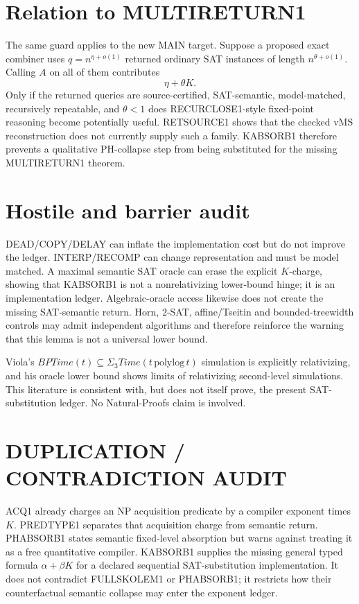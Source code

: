 \documentclass[11pt]{article}
\begin{document}
\section*{Relation to MULTIRETURN1}
The same guard applies to the new MAIN target. Suppose a proposed exact combiner uses \(q=n^{\eta+o(1)}\) returned ordinary SAT instances of length \(n^{\theta+o(1)}\). Calling \(A\) on all of them contributes
\[
\eta+\theta K.
\]
Only if the returned queries are source-certified, SAT-semantic, model-matched, recursively repeatable, and \(\theta<1\) does RECURCLOSE1-style fixed-point reasoning become potentially useful. RETSOURCE1 shows that the checked vMS reconstruction does not currently supply such a family. KABSORB1 therefore prevents a qualitative PH-collapse step from being substituted for the missing MULTIRETURN1 theorem.

\section*{Hostile and barrier audit}
DEAD/COPY/DELAY can inflate the implementation cost but do not improve the ledger. INTERP/RECOMP can change representation and must be model matched. A maximal semantic SAT oracle can erase the explicit \(K\)-charge, showing that KABSORB1 is not a nonrelativizing lower-bound hinge; it is an implementation ledger. Algebraic-oracle access likewise does not create the missing SAT-semantic return. Horn, 2-SAT, affine/Tseitin and bounded-treewidth controls may admit independent algorithms and therefore reinforce the warning that this lemma is not a universal lower bound.

Viola's \(BPTime(t)\subseteq\Sigma_3Time(t\,\mathrm{polylog}\,t)\) simulation is explicitly relativizing, and his oracle lower bound shows limits of relativizing second-level simulations. This literature is consistent with, but does not itself prove, the present SAT-substitution ledger. No Natural-Proofs claim is involved.

\section*{DUPLICATION / CONTRADICTION AUDIT}
ACQ1 already charges an NP acquisition predicate by a compiler exponent times \(K\). PREDTYPE1 separates that acquisition charge from semantic return. PHABSORB1 states semantic fixed-level absorption but warns against treating it as a free quantitative compiler. KABSORB1 supplies the missing general typed formula \(\alpha+\beta K\) for a declared sequential SAT-substitution implementation. It does not contradict FULLSKOLEM1 or PHABSORB1; it restricts how their counterfactual semantic collapse may enter the exponent ledger.
\end{document}
